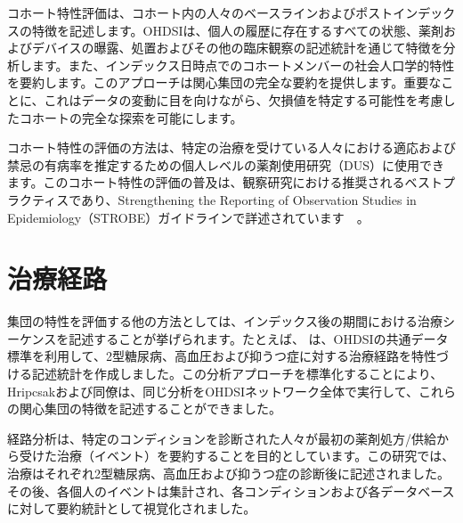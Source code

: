 \documentclass[
  11pt]{book}
\theoremstyle{definition}
\theoremstyle{definition}
\theoremstyle{definition}
\theoremstyle{definition}
\theoremstyle{remark}
\begin{document}
コホート特性評価は、コホート内の人々のベースラインおよびポストインデックスの特徴を記述します。OHDSIは、個人の履歴に存在するすべての状態、薬剤およびデバイスの曝露、処置およびその他の臨床観察の記述統計を通じて特徴を分析します。また、インデックス日時点でのコホートメンバーの社会人口学的特性を要約します。このアプローチは関心集団の完全な要約を提供します。重要なことに、これはデータの変動に目を向けながら、欠損値を特定する可能性を考慮したコホートの完全な探索を可能にします。

コホート特性の評価の方法は、特定の治療を受けている人々における適応および禁忌の有病率を推定するための個人レベルの薬剤使用研究（DUS）に使用できます。このコホート特性の評価の普及は、観察研究における推奨されるベストプラクティスであり、Strengthening the Reporting of Observation Studies in Epidemiology（STROBE）ガイドラインで詳述されています　\citep{VONELM2008344}。  

\section{治療経路}\label{ux6cbbux7642ux7d4cux8def}

集団の特性を評価する他の方法としては、インデックス後の期間における治療シーケンスを記述することが挙げられます。たとえば、\citet{Hripcsak7329} は、OHDSIの共通データ標準を利用して、2型糖尿病、高血圧および抑うつ症に対する治療経路を特性づける記述統計を作成しました。この分析アプローチを標準化することにより、Hripcsakおよび同僚は、同じ分析をOHDSIネットワーク全体で実行して、これらの関心集団の特徴を記述することができました。   

経路分析は、特定のコンディションを診断された人々が最初の薬剤処方/供給から受けた治療（イベント）を要約することを目的としています。この研究では、治療はそれぞれ2型糖尿病、高血圧および抑うつ症の診断後に記述されました。その後、各個人のイベントは集計され、各コンディションおよび各データベースに対して要約統計として視覚化されました。
\end{document}
